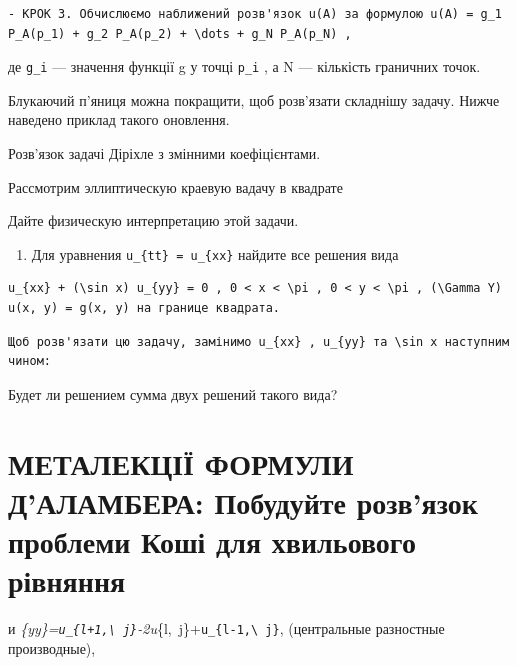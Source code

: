 \documentclass[
  ukrainian,
]{article}
\providecommand{\tightlist}{%
  \setlength{\itemsep}{0pt}\setlength{\parskip}{0pt}}
\begin{document}
\begin{verbatim}
- КРОК 3. Обчислюємо наближений розв'язок u(A) за формулою u(A) = g_1 P_A(p_1) + g_2 P_A(p_2) + \dots + g_N P_A(p_N) ,
\end{verbatim}

де \texttt{g\_i} --- значення функції g у точці \texttt{p\_i} , а N ---
кількість граничних точок.

Блукаючий п'яниця можна покращити, щоб розв'язати складнішу задачу.
Нижче наведено приклад такого оновлення.

Розв'язок задачі Діріхле з змінними коефіцієнтами.

Рассмотрим эллиптическую краевую вадачу в квадрате

Дайте физическую интерпретацию этой задачи.

\begin{enumerate}
\def\labelenumi{\arabic{enumi}.}
\setcounter{enumi}{3}
\tightlist
\item
  Для уравнения \texttt{u\_\{tt\}\ =\ u\_\{xx\}} найдите все решения
  вида
\end{enumerate}

\begin{verbatim}
u_{xx} + (\sin x) u_{yy} = 0 , 0 < x < \pi , 0 < y < \pi , (\Gamma Y) u(x, y) = g(x, y) на границе квадрата.
\end{verbatim}

\begin{verbatim}
Щоб розв'язати цю задачу, замінимо u_{xx} , u_{yy} та \sin x наступним чином:
\end{verbatim}

Будет ли решением сумма двух решений такого вида?

\section{МЕТАЛЕКЦІЇ ФОРМУЛИ Д'АЛАМБЕРА: Побудуйте розв'язок проблеми
Коші для хвильового
рівняння}\label{ux43cux435ux442ux430ux43bux435ux43aux446ux456ux457-ux444ux43eux440ux43cux443ux43bux438-ux434ux430ux43bux430ux43cux431ux435ux440ux430-ux43fux43eux431ux443ux434ux443ux439ux442ux435-ux440ux43eux437ux432ux44fux437ux43eux43a-ux43fux440ux43eux431ux43bux435ux43cux438-ux43aux43eux448ux456-ux434ux43bux44f-ux445ux432ux438ux43bux44cux43eux432ux43eux433ux43e-ux440ux456ux432ux43dux44fux43dux43dux44f}

и
\emph{\{yy\}=\texttt{u\_\{l+1,\textbackslash{}\ j\}}-2u}\{l,~j\}+\texttt{u\_\{l-1,\textbackslash{}\ j\}},
(центральные разностные производные),
\end{document}
